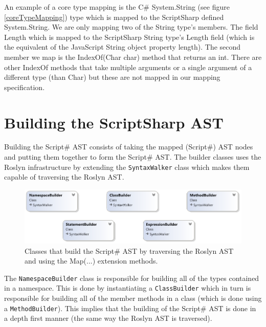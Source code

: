 			An example of a core type mapping is the C\# System.String (see figure \ref{coreTypeMapping}) type which is mapped to the ScriptSharp defined System.String. We are only mapping two of the String type’s members. The field Length which is mapped to the ScriptSharp String type’s Length field (which is the equivalent of the JavaScript String object property length). The second member we map is the IndexOf(Char char) method that returns an int. There are other IndexOf methods that take multiple arguments or a single argument of a different type (than Char) but these are not mapped in our mapping specification.

\section{Building the ScriptSharp AST} %
\label{sec:building_the_scriptsharp_ast}
	Building the Script\# AST consists of taking the mapped (Script\#) AST nodes and putting them together to form the Script\# AST. The builder classes uses the Roslyn infrastructure by extending the \texttt{SyntaxWalker} class which makes them capable of traversing the Roslyn AST.
	\begin{figure}[H]
		\begin{center}
			\centerline{\includegraphics[width=16cm]{resources/images/BuilderClasses.png}}
		\end{center}
		\caption{Classes that build the Script\# AST by traversing the Roslyn AST and using the Map(...) extension methods.}
		\label{builderClasses}
	\end{figure}

	The \texttt{NamespaceBuilder} class is responsible for building all of the types contained in a namespace. This is done by instantiating a \texttt{ClassBuilder} which in turn is responsible for building all of the member methods in a class (which is done using a \texttt{MethodBuilder}). This implies that the building of the Script\# AST is done in a depth first manner (the same way the Roslyn AST is traversed).  

